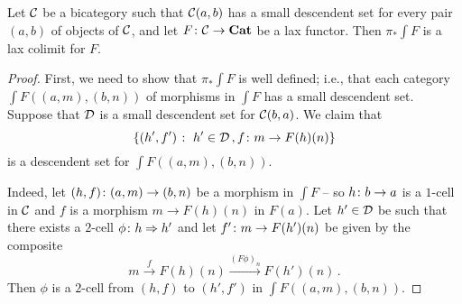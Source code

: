 \begin{proposition}
  Let ${\mathcal{C}}$ be a bicategory such that ${\mathcal{C}}(a,b)$ has a small descendent set for every pair $(a,b)$ of objects of ${\mathcal{C}}$, and let $F\colon {\mathcal{C}} \to {\normalfont\textbf{Cat}}$ be a lax functor.  
  Then $\pi_*\int F$ is a lax colimit for $F$.
  \label{PropGrotLaxLimit}
\end{proposition}
\begin{proof}
  First, we need to show that $\pi_*\int F$ is well defined; i.e., that each category $\int F((a,m), (b,n))$ of morphisms in $\int F$ has a small descendent set.  
  Suppose that ${\mathcal{D}}$ is a small descendent set for ${\mathcal{C}}(b, a)$.
  We claim that
  \[
    \{(h', f')\;\colon\; h'\in {\mathcal{D}}\,,f \colon m \to F(h)(n)\}
    \]
  is a descendent set for $\int F((a,m), (b,n))$.  

  Indeed, let $(h,f) \colon (a, m) \to (b, n)$ be a morphism in $\int F$ -- so $h \colon b \to a$ is a $1$-cell in ${\mathcal{C}}$ and $f$ is a morphism $m \to F(h)(n)$ in $F(a)$.
  Let $h'\in {\mathcal{D}}$ be such that there exists a $2$-cell $\phi \colon h \Rightarrow h'$ and let $f'\colon m \to F(h')(n)$ be given by the composite
  \[
    m \xrightarrow{f} F(h)(n) \xrightarrow{(F\phi)_n} F(h')(n)\,.
    \]
  Then $\phi$ is a $2$-cell from $(h,f)$ to $(h',f')$ in $\int F((a,m),(b,n))$.


\end{proof}
